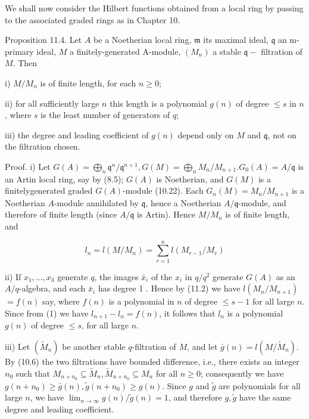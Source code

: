 \documentclass{standalone}
\theoremstyle{definition}
\theoremstyle{remark}
\begin{document}
We shall now consider the Hilbert functions obtained from a local ring by passing to the associated graded rings as in Chapter 10.

Proposition 11.4. Let $A$ be a Noetherian local ring, $\mathfrak{m}$ its maximal ideal, $\mathfrak{q}$ an m-primary ideal, $M$ a finitely-generated A-module, $\left(M_{n}\right)$ a stable $\mathfrak{q}-$ filtration of $M$. Then

i) $M / M_{n}$ is of finite length, for each $n \geqslant 0$;

ii) for all sufficiently large $n$ this length is a polynomial $g(n)$ of degree $\leqslant s$ in $n$, where $s$ is the least number of generators of $q$;

iii) the degree and leading coefficient of $g(n)$ depend only on $M$ and $\mathfrak{q}$, not on the filtration chosen.

Proof. i) Let $G(A)=\bigoplus_{n} \mathfrak{q}^{n} / \mathfrak{q}^{n+1}, G(M)=\bigoplus_{n} M_{n} / M_{n+1} . G_{0}(A)=A / \mathfrak{q}$ is an Artin local ring, say by (8.5); $G(A)$ is Noetherian, and $G(M)$ is a finitelygenerated graded $G(A)$-module (10.22). Each $G_{n}(M)=M_{n} / M_{n+1}$ is a Noetherian $A$-module annihilated by $\mathfrak{q}$, hence a Noetherian $A / \mathfrak{q}$-module, and therefore of finite length (since $A / \mathfrak{q}$ is Artin). Hence $M / M_{n}$ is of finite length, and

\[
l_{n}=l\left(M / M_{n}\right)=\sum_{r=1}^{n} l\left(M_{r-1} / M_{r}\right)
\]

ii) If $x_{1}, \ldots, x_{3}$ generate $q$, the images $\bar{x}_{i}$ of the $x_{i}$ in $q / q^{2}$ generate $G(A)$ as an $A / q$-algebra, and each $\bar{x}_{i}$ has degree 1 . Hence by (11.2) we have $l\left(M_{n} / M_{n+1}\right)$ $=f(n)$ say, where $f(n)$ is a polynomial in $n$ of degree $\leqslant s-1$ for all large $n$. Since from (1) we have $l_{n+1}-l_{n}=f(n)$, it follows that $l_{n}$ is a polynomial $g(n)$ of degree $\leqslant s$, for all large $n$.

iii) Let $\left(\tilde{M}_{n}\right)$ be another stable $q$-filtration of $M$, and let $\bar{g}(n)=l\left(M / \tilde{M}_{n}\right)$. By (10.6) the two filtrations have bounded difference, i.e., there exists an integer $n_{0}$ such that $M_{n+n_{0}} \subseteq \tilde{M}_{n}, \tilde{M}_{n+n_{0}} \subseteq M_{n}$ for all $n \geqslant 0$; consequently we have $g\left(n+n_{0}\right) \geqslant \bar{g}(n), \tilde{g}\left(n+n_{0}\right) \geqslant g(n)$. Since $g$ and $\tilde{g}$ are polynomials for all large $n$, we have $\lim _{n \rightarrow \infty} g(n) / \tilde{g}(n)=1$, and therefore $g, \tilde{g}$ have the same degree and leading coefficient.
\end{document}
